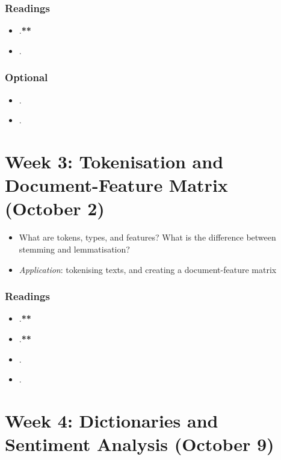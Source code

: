 \documentclass[abstract=on,parskip=full,headings=standardclasses,fontsize=11pt,paper=a4]{scrartcl}
\begin{document}
\subsubsection*{Readings}
\begin{itemize}
\item {}.\textbf{**}
\item {}.
\end{itemize}


\subsubsection*{Optional}
\begin{itemize}
\item {}.
\item {}.
\end{itemize}

\section{Week 3:  Tokenisation and Document-Feature Matrix (October 2)}

\begin{itemize}
\renewcommand\labelitemi{--}
\item What are tokens, types, and features? What is the difference between stemming and lemmatisation?
\item \textit{Application}: tokenising texts, and creating a document-feature matrix
\end{itemize}

\subsubsection*{Readings}
\begin{itemize}
 \item {}.\textbf{**}
  \item {}.\textbf{**}
 \item {}.
 \item {}.
\end{itemize}
 
  
\section{Week 4: Dictionaries and Sentiment Analysis (October 9)}
\end{document}
